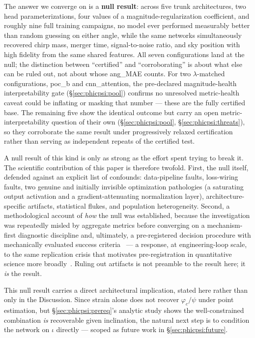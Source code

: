 The answer we converge on is a \textbf{null result}: across five trunk architectures, two head parameterizations, four values of a magnitude-regularization coefficient, and roughly nine full training campaigns, no model ever performed measurably better than random guessing on either angle, while the same networks simultaneously recovered chirp mass, merger time, signal-to-noise ratio, and sky position with high fidelity from the same shared features.
All seven configurations land at the null; the distinction between ``certified'' and ``corroborating'' is about what else can be ruled out, not about whose ang\_MAE counts.
For two $\lambda$-matched configurations, poc\_b and cnn\_attention, the pre-declared magnitude-health interpretability gate (\S\ref{sec:phicpsi:pool}) confirms no unresolved metric-health caveat could be inflating or masking that number --- these are the fully certified base.
The remaining five show the identical outcome but carry an open metric-interpretability question of their own (\S\ref{sec:phicpsi:pool}, \S\ref{sec:phicpsi:threats}), so they corroborate the same result under progressively relaxed certification rather than serving as independent repeats of the certified test.

A null result of this kind is only as strong as the effort spent trying to break it.
The scientific contribution of this paper is therefore twofold.
First, the null itself, defended against an explicit list of confounds: data-pipeline faults, loss-wiring faults, two genuine and initially invisible optimization pathologies (a saturating output activation and a gradient-attenuating normalization layer), architecture-specific artifacts, statistical flukes, and population heterogeneity.
Second, a methodological account of \emph{how} the null was established, because the investigation was repeatedly misled by aggregate metrics before converging on a mechanism-first diagnostic discipline and, ultimately, a pre-registered decision procedure with mechanically evaluated success criteria~\citep{nosek2018preregistration} --- a response, at engineering-loop scale, to the same replication crisis that motivates pre-registration in quantitative science more broadly~\citep{ioannidis2005false}.
Ruling out artifacts is not preamble to the result here; it \emph{is} the result.

This null result carries a direct architectural implication, stated here rather than only in the Discussion.
Since strain alone does not recover $\varphi_c/\psi$ under point estimation, but \S\ref{sec:phicpsi:prereq}'s analytic study shows the well-constrained combination \emph{is} recoverable given inclination, the natural next step is to condition the network on $\iota$ directly --- scoped as future work in \S\ref{sec:phicpsi:future}.

